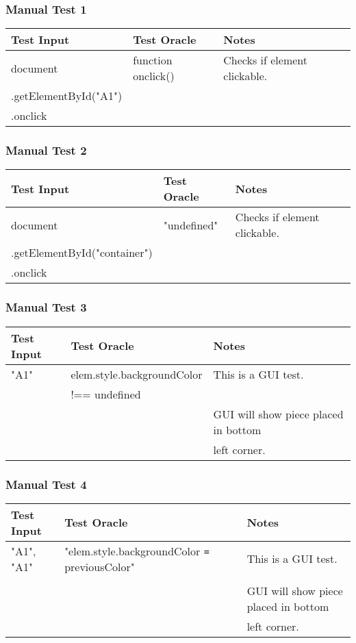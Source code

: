 \documentclass[11pt]{article}
\begin{document}
\subsubsection{Manual Test 1}
\label{sec:orgb3e42e3}
\begin{center}
\begin{tabular}{|p{6.0cm}|p{4.0cm}|p{3.0cm}|}
Test Input & Test Oracle & Notes\\
\hline
document & function onclick() & Checks if element clickable.\\
.getElementById("A1") &  & \\
.onclick &  & \\
\end{tabular}
\end{center}

\subsubsection{Manual Test 2}
\label{sec:orge297348}
\begin{center}
\begin{tabular}{|p{6.0cm}|p{4.0cm}|p{3.0cm}|}
Test Input & Test Oracle & Notes\\
\hline
document & "undefined" & Checks if element clickable.\\
.getElementById("container") &  & \\
.onclick &  & \\
\end{tabular}
\end{center}

\subsubsection{Manual Test 3}
\label{sec:org39dc7b5}
\begin{center}
\begin{tabular}{|p{4.0cm}|p{6.0cm}|p{3.0cm}|}
Test Input & Test Oracle & Notes\\
\hline
"A1" & elem.style.backgroundColor & This is a GUI test.\\
 & !== undefined & \\
 &  & GUI will show piece placed in bottom\\
 &  & left corner.\\
\end{tabular}
\end{center}

\subsubsection{Manual Test 4}
\label{sec:orga5162a1}
\begin{center}
\begin{tabular}{|p{2.0cm}|p{8.0cm}|p{3.0cm}|}
Test Input & Test Oracle & Notes\\
\hline
"A1", "A1" & "elem.style.backgroundColor \texttt{=} previousColor" & This is a GUI test.\\
 &  & \\
 &  & GUI will show piece placed in bottom\\
 &  & left corner.\\
\end{tabular}
\end{center}
\end{document}
